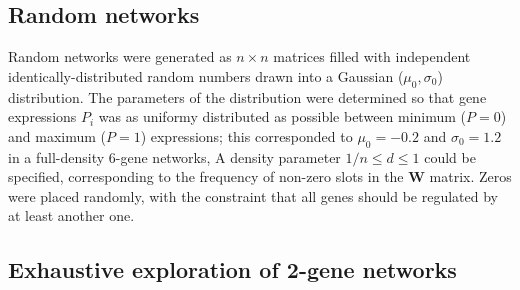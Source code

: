 \documentclass[10pt,a4paper]{article}
\begin{document}
\subsection{Random networks}

Random networks were generated as $n\times n$ matrices filled with independent identically-distributed random numbers drawn into a Gaussian ($\mu_0, \sigma_0$) distribution. The parameters of the distribution were determined so that gene expressions $P_i$ was as uniformy distributed as possible between minimum ($P=0$) and maximum ($P=1$) expressions; this corresponded to $\mu_0=-0.2$ and $\sigma_0=1.2$ in a full-density 6-gene networks, A density parameter $1/n \leq d \leq 1$ could be specified, corresponding to the frequency of non-zero slots in the $\bm W$ matrix. Zeros were placed randomly, with the constraint that all genes should be regulated by at least another one. 

\subsection{Exhaustive exploration of 2-gene networks}
\end{document}
